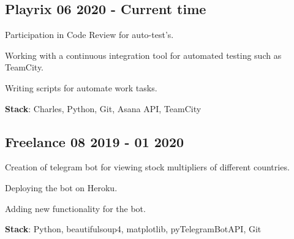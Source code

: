 \documentclass[a4paper,12pt]{article}
\begin{document}


\vspace*{2pt}

\subsection{{Playrix } \hfill 06 2020 - Current time}

\begin{zitemize}
\item Participation in Code Review for auto-test's.
\item Working with a continuous integration tool for automated testing such as TeamCity.
\item Writing scripts for automate work tasks.
\end{zitemize}

\vspace*{0.5pt} \textbf {Stack}: Charles, Python, Git, Asana API, TeamCity



\vspace*{8pt}

\subsection{{Freelance } \hfill 08 2019 - 01 2020}

\begin{zitemize}
\item Creation of telegram bot for viewing stock multipliers of different countries.
\item Deploying the bot on Heroku.
\item Adding new functionality for the bot.
\end{zitemize}

\vspace*{0.5pt} \textbf {Stack}: Python, beautifulsoup4, matplotlib, pyTelegramBotAPI, Git
\end{document}
